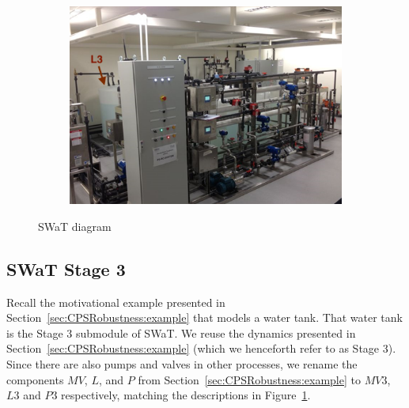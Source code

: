 {{\begin{figure}[htb]
\begin{subfigure}[b]{.35\linewidth}
  \end{subfigure}
  \begin{subfigure}[b]{.35\linewidth}
  \includegraphics[width=\linewidth]{Figures/testbed2.png}
  \end{subfigure}
  
    \caption{SWaT diagram}
  \label{fig:CPSRobustness:SWaTSchema}
\end{figure}

\subsection{SWaT Stage 3}
Recall the motivational example presented in Section~\ref{sec:CPSRobustness:example} that models a water tank. That water tank is the Stage 3 submodule of SWaT. We reuse the dynamics presented in Section~\ref{sec:CPSRobustness:example} (which we henceforth refer to as Stage 3). Since there are also pumps and valves in other processes, we rename the components $MV$, $L$, and $P$ from Section~\ref{sec:CPSRobustness:example} to $MV3$, $L3$ and $P3$ respectively, matching the descriptions in Figure~\ref{fig:CPSRobustness:SWaTSchema}.

}}
